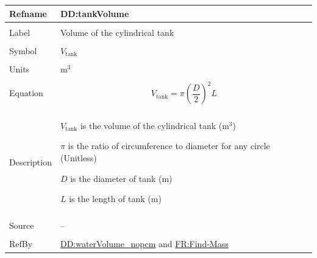 \documentclass[12pt]{article}
\begin{document}
\vspace{\baselineskip}
\noindent
\begin{minipage}{\textwidth}
\begin{tabular}{>{\raggedright}p{}>{\raggedright\arraybackslash}p{}}
\toprule \textbf{Refname} & \textbf{DD:tankVolume}
\label{DD:tankVolume}
\\ \midrule \\
Label & Volume of the cylindrical tank
        
\\ \midrule \\
Symbol & ${V_{\text{tank}}}$
         
\\ \midrule \\
Units & ${\text{m}^{3}}$
        
\\ \midrule \\
Equation & \begin{displaymath}
           {V_{\text{tank}}}=π \left(\frac{D}{2}\right)^{2} L
           \end{displaymath}
\\ \midrule \\
Description & \begin{symbDescription}
              \item{${V_{\text{tank}}}$ is the volume of the cylindrical tank (${\text{m}^{3}}$)}
              \item{$π$ is the ratio of circumference to diameter for any circle (Unitless)}
              \item{$D$ is the diameter of tank (${\text{m}}$)}
              \item{$L$ is the length of tank (${\text{m}}$)}
              \end{symbDescription}
\\ \midrule \\
Source & --
         
\\ \midrule \\
RefBy & \hyperref[DD:waterVolume.nopcm]{DD:waterVolume\_nopcm} and \hyperref[findMass]{FR:Find-Mass}
        
\\ \bottomrule
\end{tabular}
\end{minipage}
\end{document}

